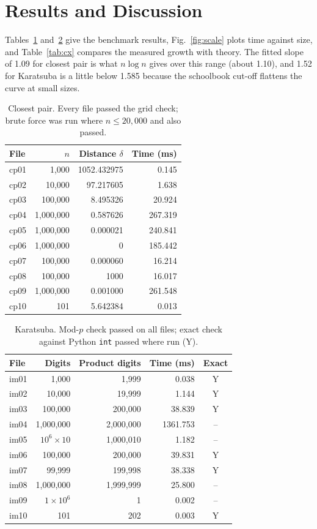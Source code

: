 \documentclass[10pt,twocolumn]{article}
\begin{document}
\section{Results and Discussion}
Tables~\ref{tab:cp} and~\ref{tab:im} give the benchmark results, Fig.~\ref{fig:scale} plots time against size, and Table~\ref{tab:cx} compares the measured growth with theory. The fitted slope of 1.09 for closest pair is what $n\log n$ gives over this range (about 1.10), and 1.52 for Karatsuba is a little below 1.585 because the schoolbook cut-off flattens the curve at small sizes.

\begin{table}[h]
\centering\footnotesize\setlength{\tabcolsep}{3pt}
\caption{Closest pair. Every file passed the grid check; brute force was run where $n\le 20{,}000$ and also passed.}\label{tab:cp}
\begin{tabular}{@{}l r r r@{}}
\toprule
File & $n$ & Distance $\delta$ & Time (ms)\\\midrule
cp01 & 1,000 & 1052.432975 & 0.145\\
cp02 & 10,000 & 97.217605 & 1.638\\
cp03 & 100,000 & 8.495326 & 20.924\\
cp04 & 1,000,000 & 0.587626 & 267.319\\
cp05 & 1,000,000 & 0.000021 & 240.841\\
cp06 & 1,000,000 & 0 & 185.442\\
cp07 & 100,000 & 0.000060 & 16.214\\
cp08 & 100,000 & 1000 & 16.017\\
cp09 & 1,000,000 & 0.001000 & 261.548\\
cp10 & 101 & 5.642384 & 0.013\\\bottomrule
\end{tabular}
\end{table}

\begin{table}[h]
\centering\footnotesize\setlength{\tabcolsep}{3pt}
\caption{Karatsuba. Mod-$p$ check passed on all files; exact check against Python \texttt{int} passed where run (Y).}\label{tab:im}
\begin{tabular}{@{}l r r r c@{}}
\toprule
File & Digits & Product digits & Time (ms) & Exact\\\midrule
im01 & 1,000 & 1,999 & 0.038 & Y\\
im02 & 10,000 & 19,999 & 1.144 & Y\\
im03 & 100,000 & 200,000 & 38.839 & Y\\
im04 & 1,000,000 & 2,000,000 & 1361.753 & --\\
im05 & $10^6\times10$ & 1,000,010 & 1.182 & --\\
im06 & 100,000 & 200,000 & 39.831 & Y\\
im07 & 99,999 & 199,998 & 38.338 & Y\\
im08 & 1,000,000 & 1,999,999 & 25.800 & --\\
im09 & $1\times10^6$ & 1 & 0.002 & --\\
im10 & 101 & 202 & 0.003 & Y\\\bottomrule
\end{tabular}
\end{table}
\end{document}
